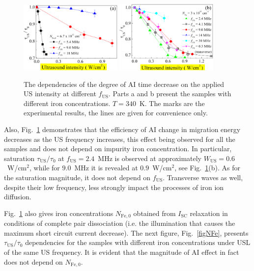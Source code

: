 \documentclass[sn-mathphys]{sn-jnl}%
\theoremstyle{thmstyleone}%
\theoremstyle{thmstyletwo}%
\theoremstyle{thmstylethree}%
\begin{document}
\begin{figure}
\centering
 \includegraphics[width=0.45\textwidth]{Fig4a}
 \includegraphics[width=0.45\textwidth]{Fig4b}
\caption{
The dependencies of the degree of AI time decrease on the applied US intensity at different $f_\mathrm{US}$.
Parts a and b present the samples with different iron concentrations.
$T=340$~K.
The marks are the experimental results, the lines are given for convenience only.
}
\label{figfus}       %
\end{figure}

Also, Fig.~\ref{figfus} demonstrates that the efficiency of
AI change in migration energy decreases as the US frequency increases,
this effect being observed for all the samples and does not depend on impurity iron concentration.
In particular, saturation $\tau_\mathrm{US}/\tau_{0}$ at $f_\mathrm{US}=2.4$~MHz is observed
at approximately $W_\mathrm{US}=0.6$~W/cm$^2$,
while for $9.0$~MHz it is revealed at $0.9$~W/cm$^2$, see Fig.~\ref{figfus}(b).
As for the saturation magnitude, it does not depend on $f_\mathrm{US}$.
Transverse waves as well, despite their low frequency, less strongly impact the processes of iron ion diffusion.

Fig.~\ref{figfus} also gives iron concentrations $N_\mathrm{Fe,0}$ obtained from $I_\mathrm{SC}$ relaxation
in conditions of complete pair dissociation (i.e. the illumination that causes the maximum short circuit current decrease).
The next figure, Fig.~\ref{figNFe}, presents $\tau_\mathrm{US}/\tau_{0}$  dependencies
for the samples with different iron concentrations under USL of the same US frequency.
It is evident that the magnitude of AI effect in fact does not depend on $N_\mathrm{Fe,0}$.
\end{document}
